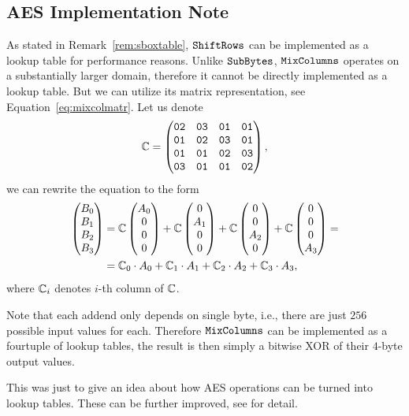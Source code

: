\subsection{AES Implementation Note}
\label{sec:aeslookup}

As stated in Remark~\ref{rem:sboxtable}, $\texttt{ShiftRows}$ can be implemented as a lookup table for performance reasons. Unlike $\texttt{SubBytes}$, $\texttt{MixColumns}$ operates on a substantially larger domain, therefore it cannot be directly implemented as a lookup table. But we can utilize its matrix representation, see Equation~\ref{eq:mixcolmatr}. Let us denote
\[
	\mathbb{C} =
	\begin{pmatrix}
		\texttt{02} & \texttt{03} & \texttt{01} & \texttt{01} \\
		\texttt{01} & \texttt{02} & \texttt{03} & \texttt{01} \\
		\texttt{01} & \texttt{01} & \texttt{02} & \texttt{03} \\
		\texttt{03} & \texttt{01} & \texttt{01} & \texttt{02}
	\end{pmatrix} ,
\]
we can rewrite the equation to the form
\begin{align*}
	\begin{pmatrix}
			B_0 \\ B_1 \\ B_2 \\ B_3
		\end{pmatrix}
		&=
		\mathbb{C}
		\begin{pmatrix}
			A_0 \\ 0 \\ 0 \\ 0
		\end{pmatrix}
		+
		\mathbb{C}
		\begin{pmatrix}
			0 \\ A_1 \\ 0 \\ 0
		\end{pmatrix}
		+
		\mathbb{C}
		\begin{pmatrix}
			0 \\ 0 \\ A_2 \\ 0
		\end{pmatrix}
		+
		\mathbb{C}
		\begin{pmatrix}
			0 \\ 0 \\ 0 \\ A_3
		\end{pmatrix}
		= \\
		&=
		\mathbb{C}_0 \cdot A_0   
		 +
		\mathbb{C}_1 \cdot A_1  
		 +
		\mathbb{C}_2 \cdot A_2 
		 +
		\mathbb{C}_3 \cdot A_3 ,
\end{align*}
where $\mathbb{C}_i$ denotes $i$-th column of $\mathbb{C}$.

Note that each addend only depends on single byte, i.e., there are just $256$ possible input values for each. Therefore $\texttt{MixColumns}$ can be implemented as a fourtuple of lookup tables, the result is then simply a bitwise XOR of their $4$-byte output values.

This was just to give an idea about how AES operations can be turned into lookup tables. These can be further improved, see \cite[Chapter~4]{daemen2013rijndael} for detail.

